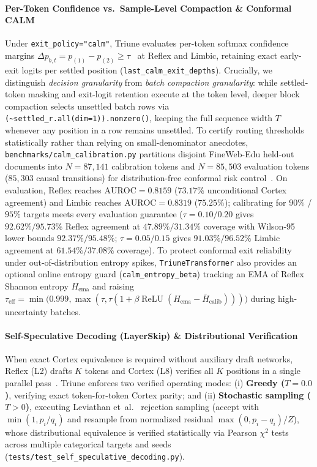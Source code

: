 \documentclass[10pt,twocolumn,letterpaper]{article}
\begin{document}
\paragraph{Per-Token Confidence vs.\ Sample-Level Compaction \& Conformal CALM} Under \texttt{exit\_policy="calm"}, Triune evaluates per-token softmax confidence margins $\Delta p_{b,t} = p_{(1)} - p_{(2)} \ge \tau$~\cite{schuster2022confident} at Reflex and Limbic, retaining exact early-exit logits per settled position (\texttt{last\_calm\_exit\_depths}). Crucially, we distinguish \emph{decision granularity} from \emph{batch compaction granularity}: while settled-token masking and exit-logit retention execute at the token level, deeper block compaction selects unsettled batch rows via \texttt{(\textasciitilde settled\_r.all(dim=1)).nonzero()}, keeping the full sequence width $T$ whenever any position in a row remains unsettled. To certify routing thresholds statistically rather than relying on small-denominator anecdotes, \texttt{benchmarks/calm\_calibration.py} partitions disjoint FineWeb-Edu held-out documents into $N=87,141$ calibration tokens and $N=85,503$ evaluation tokens ($85,303$ causal transitions) for distribution-free conformal risk control~\cite{angelopoulos2021gentle,wilson1927probable}. On evaluation, Reflex reaches $\text{AUROC}=0.8159$ ($73.17\%$ unconditional Cortex agreement) and Limbic reaches $\text{AUROC}=0.8319$ ($75.25\%$); calibrating for $90\%$ / $95\%$ targets meets every evaluation guarantee ($\tau=0.10/0.20$ gives $92.62\%/95.73\%$ Reflex agreement at $47.89\%/31.34\%$ coverage with Wilson-95 lower bounds $92.37\%/95.48\%$; $\tau=0.05/0.15$ gives $91.03\%/96.52\%$ Limbic agreement at $61.54\%/37.08\%$ coverage). To protect conformal exit reliability under out-of-distribution entropy spikes, \texttt{TriuneTransformer} also provides an optional online entropy guard (\texttt{calm\_entropy\_beta}) tracking an EMA of Reflex Shannon entropy $H_{\text{ema}}$ and raising $\tau_{\text{eff}} = \min\!\big(0.999, \max(\tau, \tau (1 + \beta \operatorname{ReLU}(H_{\text{ema}} - \bar{H}_{\text{calib}})))\big)$ during high-uncertainty batches.

\paragraph{Self-Speculative Decoding (LayerSkip) \& Distributional Verification} When exact Cortex equivalence is required without auxiliary draft networks, Reflex (L2) drafts $K$ tokens and Cortex (L8) verifies all $K$ positions in a single parallel pass~\cite{elhoushi2024layerskip}. Triune enforces two verified operating modes: (i) \textbf{Greedy ($T=0.0$)}, verifying exact token-for-token Cortex parity; and (ii) \textbf{Stochastic sampling ($T>0$)}, executing Leviathan et~al.~\cite{leviathan2023fast} rejection sampling (accept with $\min(1, p_i/q_i)$ and resample from normalized residual $\max(0, p_i - q_i)/Z$), whose distributional equivalence is verified statistically via Pearson $\chi^2$ tests across multiple categorical targets and seeds (\texttt{tests/test\_self\_speculative\_decoding.py}).
\end{document}
